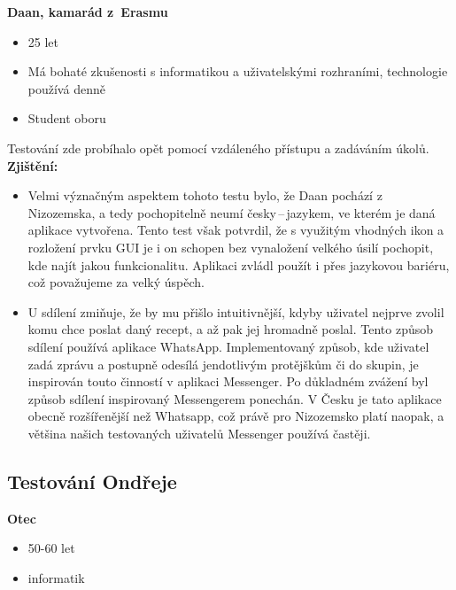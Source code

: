\documentclass[a4paper, 11pt]{article}
\begin{document}
\noindent\textbf{Daan, kamarád z~Erasmu} \\[-1em]
\begin{itemize}
    \item 25 let
    \item Má bohaté zkušenosti s informatikou a uživatelskými rozhraními, technologie používá denně
    \item Student oboru 
\end{itemize}

Testování zde probíhalo opět pomocí vzdáleného přístupu a zadáváním úkolů. \\

\textbf{Zjištění:}
\begin{itemize}
    \item Velmi význačným aspektem tohoto testu bylo, že Daan pochází z Nizozemska, a tedy
    pochopitelně neumí česky\,--\,jazykem, ve kterém je daná aplikace vytvořena. Tento test však
    potvrdil, že s využitým vhodných ikon a rozložení prvku GUI je i on schopen bez vynaložení velkého úsilí pochopit,
    kde najít jakou funkcionalitu. Aplikaci zvládl použít i přes jazykovou bariéru, což považujeme
    za velký úspěch.

    \item U sdílení zmiňuje, že by mu přišlo intuitivnější, kdyby uživatel nejprve zvolil komu
    chce poslat daný recept, a až pak jej hromadně poslal. Tento způsob sdílení používá aplikace
    WhatsApp. Implementovaný způsob, kde uživatel zadá zprávu a postupně odesílá jendotlivým
    protějškům či do skupin, je inspirován touto činností v aplikaci Messenger. Po důkladném zvážení
    byl způsob sdílení inspirovaný Messengerem ponechán. V Česku je tato aplikace obecně rozšířenější
    než Whatsapp, což právě pro Nizozemsko platí naopak, a většina našich testovaných uživatelů Messenger používá
    častěji.
\end{itemize}


\subsection{Testování Ondřeje}

\noindent\textbf{Otec} \\[-1em]
\begin{itemize}
    \item 50-60 let
	\item informatik
\end{itemize}
\end{document}
